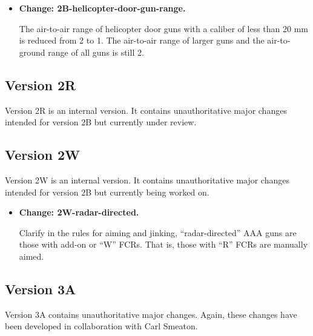 \documentclass{report}
\newcommand{\changetag}[1]{\textbf{Change: #1.}\par}
\begin{document}
\begin{itemize}
    \item\changetag{2B-helicopter-door-gun-range}

        The air-to-air range of helicopter door guns with a caliber of less than 20 mm is reduced from 2 to 1. The air-to-air range of larger guns and the air-to-ground range of all guns is still 2.

\end{itemize}

\subsection{Version 2R}

Version 2R is an internal version. It contains unauthoritative major changes intended for version 2B but currently under review.


\subsection{Version 2W}

Version 2W is an internal version. It contains unauthoritative major changes intended for version 2B but currently being worked on.

\begin{itemize}

    \item\changetag{2W-radar-directed}

        Clarify in the rules for aiming and jinking, “radar-directed” AAA guns are those with add-on or “W” FCRs. That is, those with “R” FCRs are manually aimed.

\end{itemize}

\subsection{Version 3A}

Version 3A contains unauthoritative major changes. Again, these changes have been developed in collaboration with Carl Smeaton.
\end{document}
